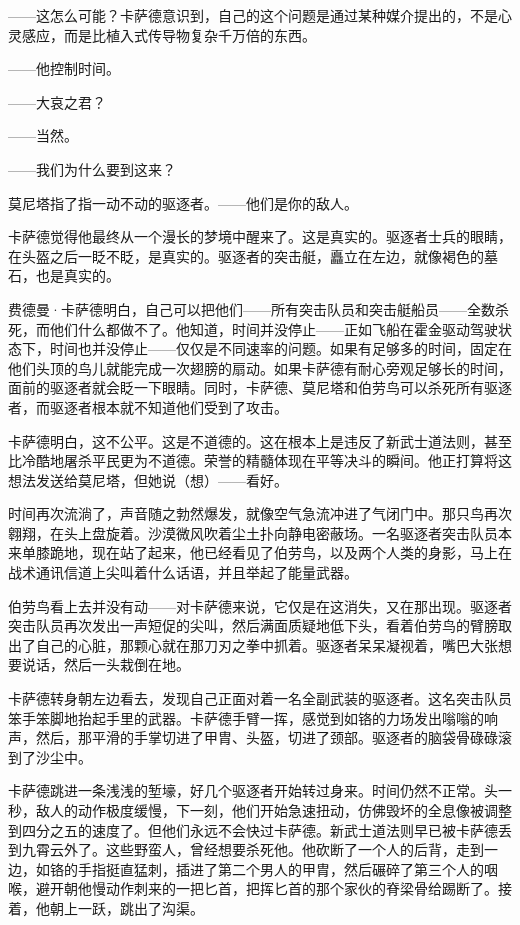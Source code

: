 \documentclass[AutoFakeBold=true]{book}
\begin{document}
{\kaishu ——这怎么可能？}卡萨德意识到，自己的这个问题是通过某种媒介提出的，不是心灵感应，而是比植入式传导物复杂千万倍的东西。

{\kaishu ——他控制时间。}

{\kaishu ——大哀之君？}

{\kaishu ——当然。}

{\kaishu ——我们为什么要到这来？}

莫尼塔指了指一动不动的驱逐者。{\kaishu ——他们是你的敌人。}

卡萨德觉得他最终从一个漫长的梦境中醒来了。这是真实的。驱逐者士兵的眼睛，在头盔之后一眨不眨，是真实的。驱逐者的突击艇，矗立在左边，就像褐色的墓石，也是真实的。

费德曼·卡萨德明白，自己可以把他们——所有突击队员和突击艇船员——全数杀死，而他们什么都做不了。他知道，时间并没停止——正如飞船在霍金驱动驾驶状态下，时间也并没停止——仅仅是不同速率的问题。如果有足够多的时间，固定在他们头顶的鸟儿就能完成一次翅膀的扇动。如果卡萨德有耐心旁观足够长的时间，面前的驱逐者就会眨一下眼睛。同时，卡萨德、莫尼塔和伯劳鸟可以杀死所有驱逐者，而驱逐者根本就不知道他们受到了攻击。

卡萨德明白，这不公平。这是不道德的。这在根本上是违反了新武士道法则，甚至比冷酷地屠杀平民更为不道德。荣誉的精髓体现在平等决斗的瞬间。他正打算将这想法发送给莫尼塔，但她说（想）{\kaishu ——看好}。

时间再次流淌了，声音随之勃然爆发，就像空气急流冲进了气闭门中。那只鸟再次翱翔，在头上盘旋着。沙漠微风吹着尘土扑向静电密蔽场。一名驱逐者突击队员本来单膝跪地，现在站了起来，他已经看见了伯劳鸟，以及两个人类的身影，马上在战术通讯信道上尖叫着什么话语，并且举起了能量武器。

伯劳鸟看上去并没有动——对卡萨德来说，它仅是在这消失，又在那出现。驱逐者突击队员再次发出一声短促的尖叫，然后满面质疑地低下头，看着伯劳鸟的臂膀取出了自己的心脏，那颗心就在那刀刃之拳中抓着。驱逐者呆呆凝视着，嘴巴大张想要说话，然后一头栽倒在地。

卡萨德转身朝左边看去，发现自己正面对着一名全副武装的驱逐者。这名突击队员笨手笨脚地抬起手里的武器。卡萨德手臂一挥，感觉到如铬的力场发出嗡嗡的响声，然后，那平滑的手掌切进了甲胄、头盔，切进了颈部。驱逐者的脑袋骨碌碌滚到了沙尘中。

卡萨德跳进一条浅浅的堑壕，好几个驱逐者开始转过身来。时间仍然不正常。头一秒，敌人的动作极度缓慢，下一刻，他们开始急速扭动，仿佛毁坏的全息像被调整到四分之五的速度了。但他们永远不会快过卡萨德。新武士道法则早已被卡萨德丢到九霄云外了。这些野蛮人，曾经想要杀死他。他砍断了一个人的后背，走到一边，如铬的手指挺直猛刺，插进了第二个男人的甲胄，然后碾碎了第三个人的咽喉，避开朝他慢动作刺来的一把匕首，把挥匕首的那个家伙的脊梁骨给踢断了。接着，他朝上一跃，跳出了沟渠。
\end{document}
